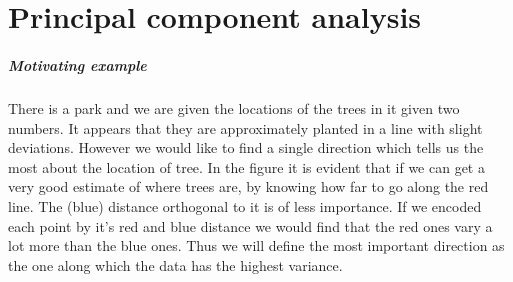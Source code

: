 \chapter{Principal component analysis}
\paragraph{Motivating example}
There is a park and we are given the locations of the trees in it
given two numbers.
It appears that they are approximately planted in a line with slight deviations.
However we would like to find a single direction which tells us the most about the location of tree.
In the figure it is evident that if we can get a very good estimate of where trees are,
by knowing how far to go along the red line. The (blue) distance orthogonal to it is of less importance.
If we encoded each point by it's red and blue distance we would find 
that the red ones vary a lot more than the blue ones.
Thus we will define the most important direction as the one along which the data has the highest variance.

